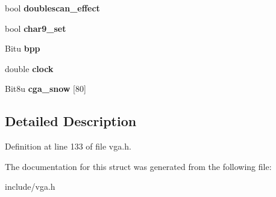\begin{DoxyCompactItemize}
\item 
\hypertarget{structVGA__Draw_a46e63c6f7ed6b2b659a472116adfc9a1}{bool {\bfseries doublescan\-\_\-effect}}\label{structVGA__Draw_a46e63c6f7ed6b2b659a472116adfc9a1}

\item 
\hypertarget{structVGA__Draw_abaa2681be86bf5437d6a0923e35eb105}{bool {\bfseries char9\-\_\-set}}\label{structVGA__Draw_abaa2681be86bf5437d6a0923e35eb105}

\item 
\hypertarget{structVGA__Draw_a6e0453a000b7fa89a66becfd79a9901c}{Bitu {\bfseries bpp}}\label{structVGA__Draw_a6e0453a000b7fa89a66becfd79a9901c}

\item 
\hypertarget{structVGA__Draw_a6025d548974fd43c733ffd89f080d9e5}{double {\bfseries clock}}\label{structVGA__Draw_a6025d548974fd43c733ffd89f080d9e5}

\item 
\hypertarget{structVGA__Draw_a427d28481b72ec7e7c0a8c8b79d62bf2}{Bit8u {\bfseries cga\-\_\-snow} \mbox{[}80\mbox{]}}\label{structVGA__Draw_a427d28481b72ec7e7c0a8c8b79d62bf2}

\end{DoxyCompactItemize}


\subsection{Detailed Description}


Definition at line 133 of file vga.\-h.



The documentation for this struct was generated from the following file\-:\begin{DoxyCompactItemize}
\item 
include/vga.\-h\end{DoxyCompactItemize}
